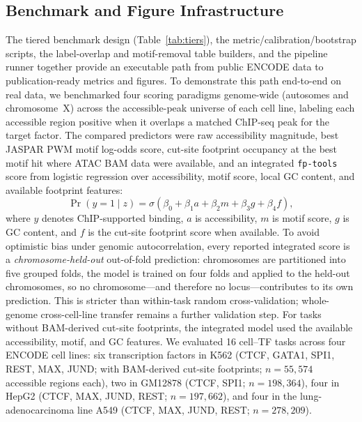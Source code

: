 \documentclass[biomedinformatics,article,submit,pdftex,moreauthors]{Definitions/mdpi}
\begin{document}
\subsection{Benchmark and Figure Infrastructure}

The tiered benchmark design (Table~\ref{tab:tiers}), the
metric/calibration/bootstrap scripts, the label-overlap and motif-removal table
builders, and the pipeline runner together provide an executable path from public
ENCODE data to publication-ready metrics and figures. To demonstrate this path
end-to-end on real data, we benchmarked four scoring paradigms genome-wide
(autosomes and chromosome~X) across the accessible-peak universe of each cell line,
labeling each accessible region positive when it overlaps a matched ChIP-seq peak
for the target factor. The compared predictors were raw accessibility magnitude,
best JASPAR PWM motif log-odds score, cut-site footprint occupancy at the best
motif hit where ATAC BAM data were available, and an integrated \texttt{fp-tools}
score from logistic regression over accessibility, motif score, local GC content,
and available footprint features:
\[
\Pr(y=1\mid z)=\sigma(\beta_0+\beta_1 a+\beta_2 m+\beta_3 g+\beta_4 f),
\]
where $y$ denotes ChIP-supported binding, $a$ is accessibility, $m$ is motif score,
$g$ is GC content, and $f$ is the cut-site footprint score when available. To avoid
optimistic bias under genomic autocorrelation, every reported integrated score is a
\emph{chromosome-held-out} out-of-fold prediction: chromosomes are partitioned into
five grouped folds, the model is trained on four folds and applied to the held-out
chromosomes, so no chromosome---and therefore no locus---contributes to its own
prediction. This is stricter than within-task random cross-validation; whole-genome
cross-cell-line transfer remains a further validation step. For tasks without
BAM-derived cut-site footprints, the integrated model used the available
accessibility, motif, and GC features. We evaluated 16 cell--TF tasks across four
ENCODE cell lines: six transcription factors in K562 (CTCF, GATA1, SPI1, REST, MAX,
JUND; with BAM-derived cut-site footprints; $n=55{,}574$ accessible regions each),
two in GM12878 (CTCF, SPI1; $n=198{,}364$), four in HepG2 (CTCF, MAX, JUND, REST;
$n=197{,}662$), and four in the lung-adenocarcinoma line A549 (CTCF, MAX, JUND,
REST; $n=278{,}209$).
\end{document}
